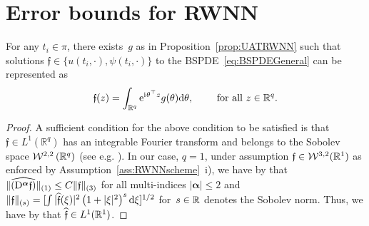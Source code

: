 \section{Error bounds for RWNN}\label{apx:errorRWNN}


\begin{lemma}\label{lem:sol_as_RWNN}
For any $t_i\in\pi$, 
there exists~$g$ as in Proposition~\ref{prop:UATRWNN}
such that solutions $\mathfrak{f}\in\{u(t_i, \cdot), \psi(t_i, \cdot)\}$ to the BSPDE~\eqref{eq:BSPDEGeneral} can be represented as
$$
\mathfrak{f}(z)=\int_{\mathbb{R}^q} \mathrm{e}^{{\mathrm{i}\mkern1mu}\theta^\top z} g(\theta) \mathrm{d} \theta,
\qquad\text{ for all }z\in\mathbb{R}^q.
$$
\end{lemma}
\begin{proof}

A sufficient condition for the above condition to be satisfied is that $\mathfrak{f} \in L^{1}\left(\mathbb{R}^{q}\right)$
has an integrable Fourier transform and belongs to the Sobolev space $\mathcal{W}^{2,2}\left(\mathbb{R}^{q}\right)$ (see e.g. \cite[Theorem~6.1]{Folland1995IntroductionEquations}). 
In our case, $q=1$, under assumption $\mathfrak{f}\in \mathcal{W}^{3,2}(\mathbb{R}^1)$ as enforced by Assumption~\ref{ass:RWNNscheme}~i), we have by \cite[Theorem~9.17]{Folland2013RealApplications} that $\|\widehat{(\mathrm{D}^{\boldsymbol\alpha} \mathfrak{f})}\|_{(1)} \leq C \|\mathfrak{f}\|_{(3)}$ for all multi-indices $|\boldsymbol\alpha|\leq 2$ and $\|\mathfrak f\|_{(s)}=[\int|\widehat{\mathfrak f}(\xi)|^2\left(1+|\xi|^2\right)^s \mathrm{d} \xi]^{1 / 2}$ for~$s\in\mathbb{R}$ denotes the Sobolev norm. Thus, we have by \cite[Corollary~2.52]{Folland2013RealApplications} that $\widehat{ \mathfrak{f}} \in L^1(\mathbb{R}^1)$.
\end{proof}


